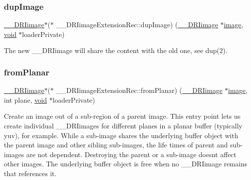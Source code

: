 \mbox{\label{struct_____d_r_iimage_extension_rec_a084831ab09b3ef978251b3f2af64ac0f}} 
\subsubsection{\texorpdfstring{dup\+Image}{dupImage}}
{\footnotesize\ttfamily \hyperlink{dri__interface_8h_a37e0407153595dc88fe5d25127645cf1}{\+\_\+\+\_\+\+D\+R\+Iimage}$\ast$($\ast$ \+\_\+\+\_\+\+D\+R\+Iimage\+Extension\+Rec\+::dup\+Image) (\hyperlink{dri__interface_8h_a37e0407153595dc88fe5d25127645cf1}{\+\_\+\+\_\+\+D\+R\+Iimage} $\ast$\hyperlink{gl_8h_a0a221b005894579fea3b9eb7bfc2ee71}{image}, \hyperlink{_s_d_l__opengles2__gl2ext_8h_ae5d8fa23ad07c48bb609509eae494c95}{void} $\ast$loader\+Private)}

The new \+\_\+\+\_\+\+D\+R\+Iimage will share the content with the old one, see dup(2). \mbox{\label{struct_____d_r_iimage_extension_rec_a631bc6c918b65f625fbb919765b886a2}} 
\subsubsection{\texorpdfstring{from\+Planar}{fromPlanar}}
{\footnotesize\ttfamily \hyperlink{dri__interface_8h_a37e0407153595dc88fe5d25127645cf1}{\+\_\+\+\_\+\+D\+R\+Iimage}$\ast$($\ast$ \+\_\+\+\_\+\+D\+R\+Iimage\+Extension\+Rec\+::from\+Planar) (\hyperlink{dri__interface_8h_a37e0407153595dc88fe5d25127645cf1}{\+\_\+\+\_\+\+D\+R\+Iimage} $\ast$\hyperlink{gl_8h_a0a221b005894579fea3b9eb7bfc2ee71}{image}, int plane, \hyperlink{_s_d_l__opengles2__gl2ext_8h_ae5d8fa23ad07c48bb609509eae494c95}{void} $\ast$loader\+Private)}

Create an image out of a sub-\/region of a parent image. This entry point lets us create individual \+\_\+\+\_\+\+D\+R\+Iimages for different planes in a planar buffer (typically yuv), for example. While a sub-\/image shares the underlying buffer object with the parent image and other sibling sub-\/images, the life times of parent and sub-\/images are not dependent. Destroying the parent or a sub-\/image doesn\textquotesingle{}t affect other images. The underlying buffer object is free when no \+\_\+\+\_\+\+D\+R\+Iimage remains that references it.

